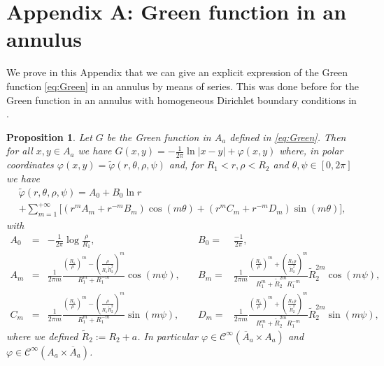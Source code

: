 \documentclass[12pt,reqno]{amsart}
\newtheorem{proposition}[theorem]{Proposition}
\def\C{{\mathcal C}}
\numberwithin{equation}{section}
\begin{document}
\section*{Appendix A: Green function in an annulus}\label{sec:AppendixA}

We prove in this Appendix that we can give an explicit expression of the Green function \eqref{eq:Green} in an annulus by means of series. This was done before for the Green function in an annulus with homogeneous Dirichlet boundary conditions in \cite{Hickey_1929}.

\begin{proposition}
Let \(G\) be the Green function in \(A_a\) defined in \eqref{eq:Green}. Then for all \(x,y\in A_a\) we have \(G(x,y)=-\frac{1}{2\pi}\ln |x-y|+\varphi (x,y)\) where, in polar coordinates \(\varphi(x,y)=\tilde{\varphi}(r,\theta, \rho,\psi)\) and, for \( R_1<r,\rho<R_2\) and \(\theta,\psi\in [0,2\pi]\) we have
\begin{multline*}
\tilde{\varphi} (r,\theta,\rho,\psi) = A_0+B_0 \ln r \\
+\sum_{m=1}^{+\infty} \bigl[ (r^mA_m+r^{-m}B_m)\cos (m\theta) +(r^mC_m+r^{-m}D_m)\sin (m\theta)\bigr],
\end{multline*}
with
\begin{equation*}
\begin{array}{rccll}
A_0&=&-\frac{1}{2\pi}\log \frac{\rho}{R_1}, \quad &B_0 =&\frac{-1}{2\pi}, \\
A_m&=& \frac{1}{2\pi m}\frac{\left(\frac{R_1}{\rho} \right)^m-\left(\frac{\rho}{R_1\tilde{R}_2^2}\right)^m }{R_1^m+R_1^{-m}}\cos (m\psi), \quad
&B_m =& \frac{1}{2\pi m}\frac{\left(\frac{R_1}{\rho} \right)^m+\left(\frac{R_1\rho}{\tilde{R}_2^2}\right)^m }{R_1^{m}+\tilde{R}_2^{2m}R_1^{-m}} \tilde{R}_2^{2m} \cos (m\psi), \\
C_m&=& \frac{1}{2\pi m}\frac{\left(\frac{R_1}{\rho} \right)^m-\left(\frac{\rho}{R_1\tilde{R}_2^2}\right)^m }{R_1^m+R_1^{-m}}\sin (m\psi),\quad
&D_m=& \frac{1}{2\pi m}\frac{\left(\frac{R_1}{\rho} \right)^m+\left(\frac{R_1\rho}{\tilde{R}_2^2}\right)^m }{R_1^{m}+\tilde{R}_2^{2m}R_1^{-m}} \tilde{R}_2^{2m} \sin (m\psi),
\end{array}
\end{equation*}
where we defined \(\tilde{R}_2:=R_2+a\). In particular \(\varphi \in \C^\infty(\overline{A}_a\times A_a)\) and \(\varphi \in \C^\infty( A_a\times \overline{A}_a)\).
\end{proposition}
\end{document}
